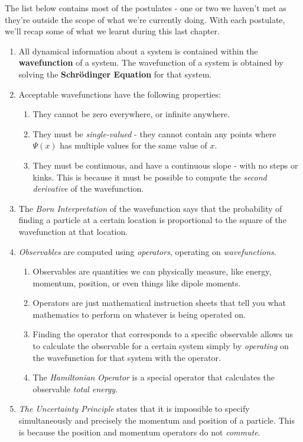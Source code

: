 \documentclass{memoir}[11pt,oneside,a4paper,openany]
\newcommand{\wf}{\ensuremath{\Psi}\xspace}
\begin{document}
The list below contains most of the postulates - one or two we haven't met as they're outside the scope of what we're currently doing. With each postulate, we'll recap some of what we learnt during this last chapter.

\begin{enumerate}
	\item All dynamical information about a system is contained within the \textbf{wavefunction} of a system. The wavefunction of a system is obtained by solving the \textbf{Schr{\"o}dinger Equation} for that system.
	\item Acceptable wavefunctions have the following properties:
		\begin{enumerate}
			\item They cannot be zero everywhere, or infinite anywhere.
			\item They must be \emph{single-valued} - they cannot contain any points where $\wf(x)$ has multiple values for the same value of $x$.
			\item They must be continuous, and have a continuous slope - with no steps or kinks. This is because it must be possible to compute the \emph{second derivative} of the wavefunction.
		\end{enumerate}
	
	\item The \emph{Born Interpretation} of the wavefunction says that the probability of finding a particle at a certain location is proportional to the square of the wavefunction at that location. 

	\item \emph{Observables} are computed using \emph{operators}, operating on \emph{wavefunctions}. 
		\begin{enumerate}
			\item Observables are quantities we can physically measure, like energy, momentum, position, or even things like dipole moments.
			\item Operators are just mathematical instruction sheets that tell you what mathematics to perform on whatever is being operated on.
			\item Finding the operator that corresponds to a specific observable allows us to calculate the observable for a certain system simply by \emph{operating} on the wavefunction for that system with the operator.
			\item The \emph{Hamiltonian Operator} is a special operator that calculates the observable \emph{total energy}.
		\end{enumerate}
	\item \emph{The Uncertainty Principle} states that it is impossible to specify simultaneously and precisely the momentum and position of a particle. This is because the position and momentum operators do not \emph{commute}.
\end{enumerate}
\end{document}

